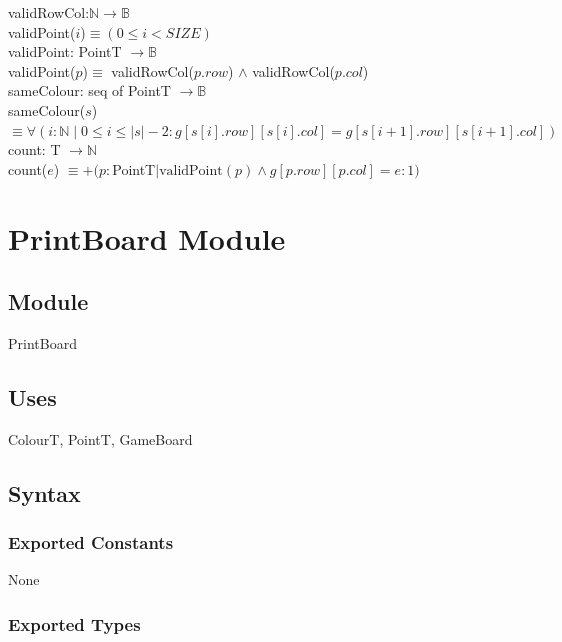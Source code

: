 \documentclass[12pt]{article}
\begin{document}
\noindent validRowCol:$\mathbb{N} \rightarrow \mathbb{B}$\\
validPoint($i$)$ \equiv (0 \le i < SIZE)$\\

\noindent validPoint: PointT $\rightarrow \mathbb{B}$\\
validPoint($p$)$ \equiv $ validRowCol($p.row$) $\land$ validRowCol($p.col$) \\

\noindent sameColour: seq of PointT $\rightarrow \mathbb{B}$\\
sameColour($s$) $\equiv \forall(i:\mathbb{N} \mid 0 \le i \le \lvert s \rvert -2 : g[s[i].row][s[i].col]= g[s[i+1].row][s[i+1].col])$\\

\noindent count: T $\rightarrow \mathbb{N}$\\
count($e$) $\equiv +(p:$PointT$\mid \mbox{validPoint}(p) \land g[p.row][p.col] = e: 1)$\\

\newpage

\section* {PrintBoard Module}

\subsection*{Module}

PrintBoard

\subsection* {Uses}

ColourT, PointT, GameBoard

\subsection* {Syntax}

\subsubsection* {Exported Constants}

None

\subsubsection* {Exported Types}
\end{document}
